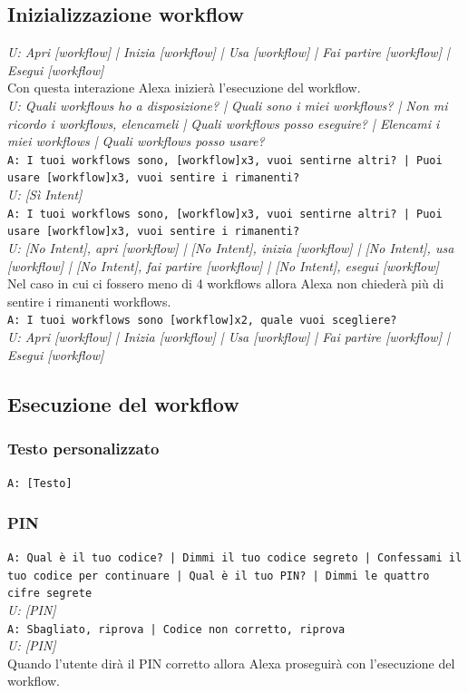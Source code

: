 \subsection{Inizializzazione workflow}
\textit{U: Apri [workflow] | Inizia [workflow] | Usa [workflow] | Fai partire [workflow] | Esegui [workflow]}\\
Con questa interazione Alexa inizierà l'esecuzione del workflow.\\
\textit{U: Quali workflows ho a disposizione? | Quali sono i miei workflows? | Non mi ricordo i workflows, elencameli | Quali workflows posso eseguire? | Elencami i miei workflows | Quali workflows posso usare?}\\
\texttt{A: I tuoi workflows sono, [workflow]x3, vuoi sentirne altri? | Puoi usare [workflow]x3, vuoi sentire i rimanenti?}\\
\textit{U: [Sì Intent]}\\
\texttt{A: I tuoi workflows sono, [workflow]x3, vuoi sentirne altri? | Puoi usare [workflow]x3, vuoi sentire i rimanenti?}\\
\textit{U: [No Intent], apri [workflow] | [No Intent], inizia [workflow] | [No Intent], usa [workflow] | [No Intent], fai partire [workflow] | [No Intent], esegui [workflow]}\\
Nel caso in cui ci fossero meno di 4 workflows allora Alexa non chiederà più di sentire i rimanenti workflows.\\
\texttt{A: I tuoi workflows sono [workflow]x2, quale vuoi scegliere?}\\
\textit{U: Apri [workflow] | Inizia [workflow] | Usa [workflow] | Fai partire [workflow] | Esegui [workflow]}\\

\subsection{Esecuzione del workflow}

\subsubsection{Testo personalizzato}
\texttt{A: [Testo]}

\subsubsection{PIN}
\texttt{A: Qual è il tuo codice? | Dimmi il tuo codice segreto | Confessami il tuo codice per continuare | Qual è il tuo PIN? | Dimmi le quattro cifre segrete}\\
\textit{U: [PIN]}\\
\texttt{A: Sbagliato, riprova | Codice non corretto, riprova}\\
\textit{U: [PIN]}\\
Quando l'utente dirà il PIN corretto allora Alexa proseguirà con l'esecuzione del workflow.

